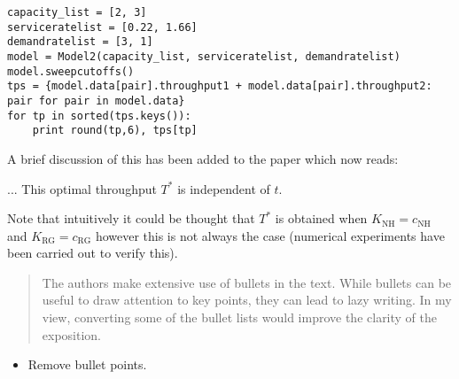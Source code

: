 \documentclass{article}
\newcommand{\NH}{\text{NH}}
\newcommand{\RG}{\text{RG}}
\begin{document}
\begin{verbatim}
capacity_list = [2, 3]
serviceratelist = [0.22, 1.66]
demandratelist = [3, 1]
model = Model2(capacity_list, serviceratelist, demandratelist)
model.sweepcutoffs()
tps = {model.data[pair].throughput1 + model.data[pair].throughput2: pair for pair in model.data}
for tp in sorted(tps.keys()):
    print round(tp,6), tps[tp]
\end{verbatim}

A brief discussion of this has been added to the paper which now reads:

... This optimal throughput \(T^*\) is
independent of \(t\).

Note that intuitively it could be thought that \(T^*\) is obtained when
\(K_{\NH}=c_{\NH}\) and \(K_{\RG}=c_{\RG}\) however this is not always the case
(numerical experiments have been carried out to verify this).


\begin{quote}
    \begin{textit}
        {
The authors make extensive use of bullets in the text. While bullets
can be useful to draw attention to key points, they can lead to lazy
writing. In my view, converting some of the bullet lists would improve
the clarity of the exposition.
        }
    \end{textit}
\end{quote}

\begin{itemize}
    \item Remove bullet points.
\end{itemize}
\end{document}
